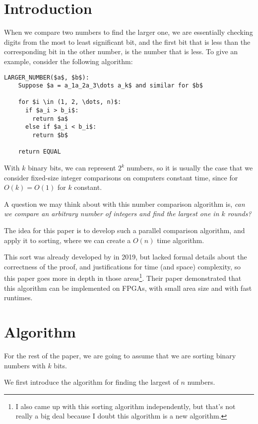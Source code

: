 \documentclass{article}
\begin{document}
\maketitle

\begin{abstract}
  We introduce a non-comparison based sort that runs in linear time, with fixed number bit size, and logic gates of linear size.
  We show that this sort can be implemented with very simple hardware components, which makes it a good candidate for a sorting algorithm on ASICs or FPGAs.
\end{abstract}


\section{Introduction}
When we compare two numbers to find the larger one, we are essentially checking digits from the most to least significant bit, and the first bit that is less than the corresponding bit in the other number, is the number that is less.
To give an example, consider the following algorithm:

\begin{lstlisting}[label={alg:find_larger_number}]
	LARGER_NUMBER($a$, $b$):
    Suppose $a = a_1a_2a_3\dots a_k$ and similar for $b$

    for $i \in (1, 2, \dots, n)$:
      if $a_i > b_i$:
        return $a$
      else if $a_i < b_i$:
        return $b$

    return EQUAL
\end{lstlisting}

With $k$ binary bits, we can represent $2^k$ numbers, so it is usually the case that we consider fixed-size integer comparisons on computers constant time, since for $O(k) = O(1)$ for $k$ constant.

A question we may think about with this number comparison algorithm is, \textit{can we compare an arbitrary number of integers and find the largest one in $k$ rounds?}

The idea for this paper is to develop such a parallel comparison algorithm, and apply it to sorting, where we can create a $O(n)$ time algorithm.

This sort was already developed by \cite{ghosh} in 2019, but lacked formal details about the correctness of the proof, and justifications for time (and space) complexity, so this paper goes more in depth in those areas\footnote{I also came up with this sorting algorithm independently, but that's not really a big deal because I doubt this algorithm is a new algorithm.}.
Their paper demonstrated that this algorithm can be implemented on FPGAs, with small area size and with fast runtimes.

\section{Algorithm}

For the rest of the paper, we are going to assume that we are sorting binary numbers with $k$ bits.

We first introduce the algorithm for finding the largest of $n$ numbers.



\end{document}
